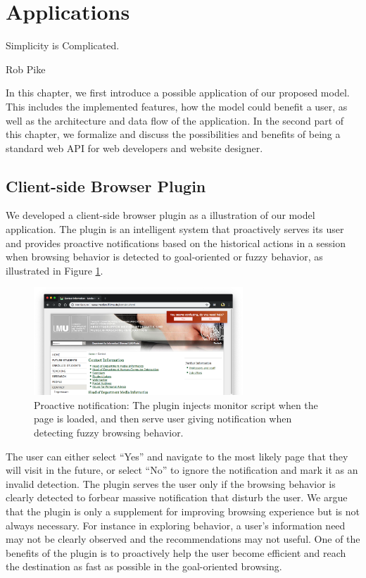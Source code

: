 \section{Applications}
\label{ch:app}

\epigraph{Simplicity is Complicated.}{Rob Pike}

In this chapter, we first introduce a possible application of our proposed model.
This includes the implemented features, how the model could benefit a user, 
as well as the architecture and data flow of the application.
In the second part of this chapter, we formalize and discuss 
the possibilities and benefits of being a standard web API for web developers 
and website designer.

\subsection{Client-side Browser Plugin}
\label{sec:plugin}

We developed a client-side browser plugin as a illustration of our model application.
The plugin is an intelligent system that proactively serves its user
and provides proactive notifications based on the historical actions in a session
when browsing behavior is detected to goal-oriented or fuzzy behavior, 
as illustrated in Figure \ref{fig:proactive-noti}.

\begin{figure}[H]
    \centering
    \includegraphics[width=0.7\textwidth]{figures/proactive-noti}
    \caption{Proactive notification:
    The plugin injects monitor script when the page is loaded, and then serve user giving
    notification when detecting fuzzy browsing behavior.}
    \label{fig:proactive-noti}
\end{figure}

The user can either select ``Yes'' and navigate to the most likely page that they 
will visit in the future, or select ``No'' to ignore the notification and mark it as an invalid detection.
The plugin serves the user only if the browsing behavior is clearly detected 
to forbear massive notification that disturb the user. 
We argue that the plugin is only a supplement for improving
browsing experience but is not always necessary. For instance in exploring behavior, 
a user's information need may not be clearly observed and the recommendations may not 
useful. 
One of the benefits of the plugin is to proactively help the user become efficient
and reach the destination as fast as possible in the goal-oriented browsing.

